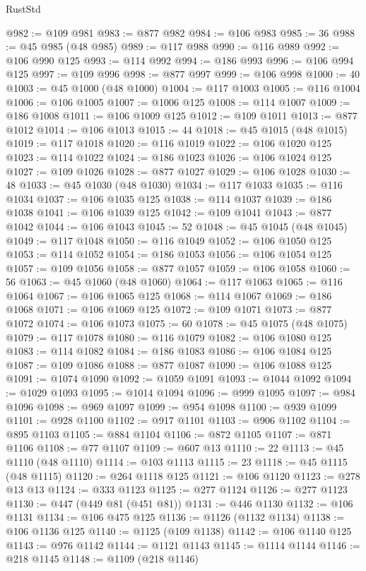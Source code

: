 \begin{lexlean}{RustStd}
\begin{coremodule}
@982 := @109 @981
@983 := @877 @982
@984 := @106 @983
@985 := 36
@988 := @45 @985 (@48 @985)
@989 := @117 @988
@990 := @116 @989
@992 := @106 @990 @125
@993 := @114 @992
@994 := @186 @993
@996 := @106 @994 @125
@997 := @109 @996
@998 := @877 @997
@999 := @106 @998
@1000 := 40
@1003 := @45 @1000 (@48 @1000)
@1004 := @117 @1003
@1005 := @116 @1004
@1006 := @106 @1005
@1007 := @1006 @125
@1008 := @114 @1007
@1009 := @186 @1008
@1011 := @106 @1009 @125
@1012 := @109 @1011
@1013 := @877 @1012
@1014 := @106 @1013
@1015 := 44
@1018 := @45 @1015 (@48 @1015)
@1019 := @117 @1018
@1020 := @116 @1019
@1022 := @106 @1020 @125
@1023 := @114 @1022
@1024 := @186 @1023
@1026 := @106 @1024 @125
@1027 := @109 @1026
@1028 := @877 @1027
@1029 := @106 @1028
@1030 := 48
@1033 := @45 @1030 (@48 @1030)
@1034 := @117 @1033
@1035 := @116 @1034
@1037 := @106 @1035 @125
@1038 := @114 @1037
@1039 := @186 @1038
@1041 := @106 @1039 @125
@1042 := @109 @1041
@1043 := @877 @1042
@1044 := @106 @1043
@1045 := 52
@1048 := @45 @1045 (@48 @1045)
@1049 := @117 @1048
@1050 := @116 @1049
@1052 := @106 @1050 @125
@1053 := @114 @1052
@1054 := @186 @1053
@1056 := @106 @1054 @125
@1057 := @109 @1056
@1058 := @877 @1057
@1059 := @106 @1058
@1060 := 56
@1063 := @45 @1060 (@48 @1060)
@1064 := @117 @1063
@1065 := @116 @1064
@1067 := @106 @1065 @125
@1068 := @114 @1067
@1069 := @186 @1068
@1071 := @106 @1069 @125
@1072 := @109 @1071
@1073 := @877 @1072
@1074 := @106 @1073
@1075 := 60
@1078 := @45 @1075 (@48 @1075)
@1079 := @117 @1078
@1080 := @116 @1079
@1082 := @106 @1080 @125
@1083 := @114 @1082
@1084 := @186 @1083
@1086 := @106 @1084 @125
@1087 := @109 @1086
@1088 := @877 @1087
@1090 := @106 @1088 @125
@1091 := @1074 @1090
@1092 := @1059 @1091
@1093 := @1044 @1092
@1094 := @1029 @1093
@1095 := @1014 @1094
@1096 := @999 @1095
@1097 := @984 @1096
@1098 := @969 @1097
@1099 := @954 @1098
@1100 := @939 @1099
@1101 := @928 @1100
@1102 := @917 @1101
@1103 := @906 @1102
@1104 := @895 @1103
@1105 := @884 @1104
@1106 := @872 @1105
@1107 := @871 @1106
@1108 := @77 @1107
@1109 := @607 @13
@1110 := 22
@1113 := @45 @1110 (@48 @1110)
@1114 := @103 @1113
@1115 := 23
@1118 := @45 @1115 (@48 @1115)
@1120 := @264 @1118 @125
@1121 := @106 @1120
@1123 := @278 @13 @13
@1124 := @333 @1123
@1125 := @277 @1124
@1126 := @277 @1123
@1130 := @447 (@449 @81 (@451 @81))
@1131 := @446 @1130
@1132 := @106 @1131
@1134 := @106 @475 @125
@1136 := @1126 (@1132 @1134)
@1138 := @106 @1136 @125
@1140 := @1125 (@109 @1138)
@1142 := @106 @1140 @125
@1143 := @976 @1142
@1144 := @1121 @1143
@1145 := @1114 @1144
@1146 := @218 @1145
@1148 := @1109 (@218 @1146)

\end{coremodule}
\end{lexlean}
